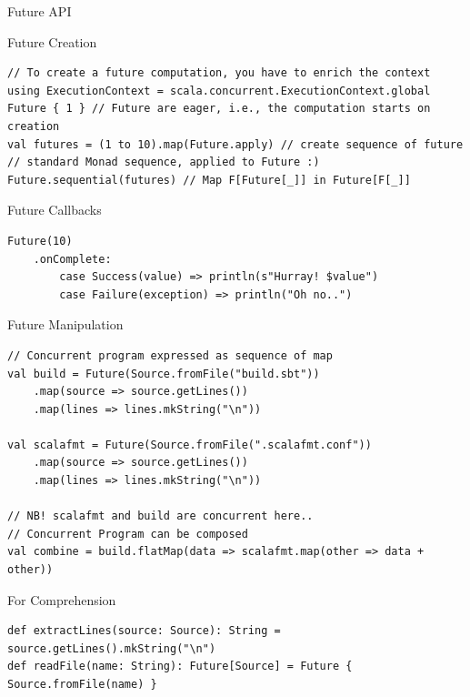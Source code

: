 \documentclass[presentation, 9pt]{beamer}\mode<presentation>{\usetheme{AMSBolognaFC}}
\begin{document}
\begin{frame}{Future API}
	\begin{alertblock}{Future Creation}
 \begin{tcolorbox}[left=0pt, top=0pt, bottom=0pt]
				\begin{verbatim}
// To create a future computation, you have to enrich the context
using ExecutionContext = scala.concurrent.ExecutionContext.global
Future { 1 } // Future are eager, i.e., the computation starts on creation
val futures = (1 to 10).map(Future.apply) // create sequence of future
// standard Monad sequence, applied to Future :)
Future.sequential(futures) // Map F[Future[_]] in Future[F[_]]
				\end{verbatim}
			\end{tcolorbox}
	\end{alertblock}
	\begin{alertblock}{Future Callbacks}
		\begin{tcolorbox}[left=0pt, top=0pt, bottom=0pt]
					 \begin{verbatim}
Future(10)
	.onComplete:
		case Success(value) => println(s"Hurray! $value")
		case Failure(exception) => println("Oh no..")

					 \end{verbatim}
				 \end{tcolorbox}
		 \end{alertblock}
		 
\begin{alertblock}{Future Manipulation}
	\begin{tcolorbox}[left=0pt, top=0pt, bottom=0pt]
					\begin{verbatim}
// Concurrent program expressed as sequence of map
val build = Future(Source.fromFile("build.sbt"))
	.map(source => source.getLines())
	.map(lines => lines.mkString("\n"))

val scalafmt = Future(Source.fromFile(".scalafmt.conf"))
	.map(source => source.getLines())
	.map(lines => lines.mkString("\n"))

// NB! scalafmt and build are concurrent here..
// Concurrent Program can be composed
val combine = build.flatMap(data => scalafmt.map(other => data + other)) 
					\end{verbatim}
				\end{tcolorbox}
\end{alertblock}
\begin{alertblock}{For Comprehension }
	\begin{tcolorbox}[left=0pt, top=0pt, bottom=0pt]
					\begin{verbatim}
def extractLines(source: Source): String = source.getLines().mkString("\n")
def readFile(name: String): Future[Source] = Future { Source.fromFile(name) }


\end{verbatim}
\end{tcolorbox}
\end{alertblock}
\end{frame}
\end{document}
